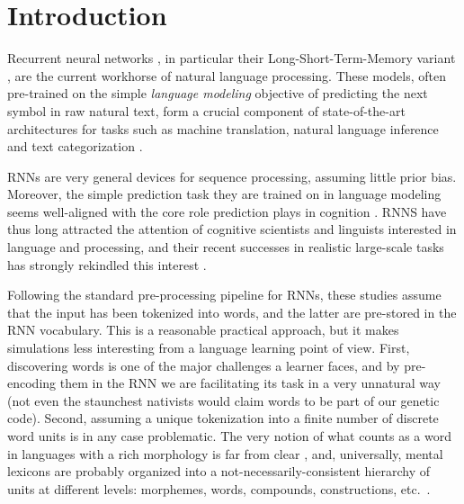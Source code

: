\section{Introduction}
\label{sec:introduction}

Recurrent neural networks \cite[RNNs,][]{Elman:1990}, in particular
their Long-Short-Term-Memory variant
\cite[LSTMs,][]{Hochreiter:Schmidhuber:1997}, are the current
workhorse of natural language processing. These models, often
pre-trained on the simple \emph{language modeling} objective of
predicting the next symbol in raw natural text, form a crucial
component of state-of-the-art architectures for tasks such as machine
translation, natural language inference and text categorization
\cite{Goldberg:2017}.

RNNs are very general devices for sequence processing, assuming little
prior bias. Moreover, the simple prediction task they are trained on
in language modeling seems well-aligned with the core role prediction
plays in cognition \cite[e.g.,][]{Bar:2007,Clark:2016}. RNNS have thus
long attracted the attention of cognitive scientists and linguists
interested in language and processing, and their recent successes in
realistic large-scale tasks has strongly rekindled this interest
\cite[see, e.g.,][and references there]{Frank:etal:2013,Lau:etal:2017,Kirov:Cotterell:2018,McCoy:etal:2018,Pater:2018}.

Following the standard pre-processing pipeline for RNNs, these studies
assume that the input has been tokenized into words, and the latter
are pre-stored in the RNN vocabulary. This is a reasonable practical
approach, but it makes simulations less interesting from a language
learning point of view. First, discovering words is one of the major
challenges a learner faces, and by pre-encoding them in the RNN we are
facilitating its task in a very unnatural way (not even the staunchest
nativists would claim words to be part of our genetic code). Second,
assuming a unique tokenization into a finite number of discrete word
units is in any case problematic. The very notion of what counts as a
word in languages with a rich morphology is far from clear
\cite[e.g.,][]{Bickel:Zuniga:2017}, and, universally, mental lexicons
are probably organized into a not-necessarily-consistent hierarchy of
units at different levels: morphemes, words, compounds, constructions,
etc.~\cite[e.g.,][]{Goldberg:2005}.

